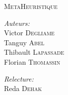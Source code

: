 \documentclass{report}
\begin{document}
\dominitoc








\begin{titlepage}
\begin{center}
\textsc{\LARGE MetaHeuristique}\\[1.5cm]
\end{center}

\begin{minipage}{0.4\textwidth}
	\begin{flushleft} \large
		\emph{Auteurs:}\\
			Victor \textsc{Degliame} \\
			Tanguy \textsc{Abel} \\
			Thibault \textsc{Lapassade} \\
			Florian \textsc{Thomassin} \\
	\end{flushleft}
\end{minipage}
\begin{minipage}{0.4\textwidth}
	\begin{flushright} \large
		\emph{Relecture:} \\
              Reda \textsc{Dehak}
	\end{flushright}
\end{minipage}
\end{titlepage}
\end{document}
